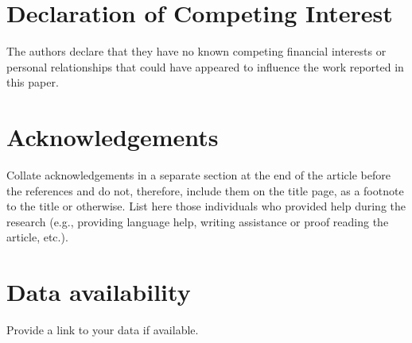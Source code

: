 \documentclass[review]{elsarticle}
\begin{document}
\section*{Declaration of Competing Interest}
The authors declare that they have no known competing financial interests or personal relationships that could have appeared to influence the work reported in this paper.

\section*{Acknowledgements}
Collate acknowledgements in a separate section at the end of the article before the references and do not, therefore, include them on the title page, as a footnote to the title or otherwise. List here those individuals who provided help during the research (e.g., providing language help, writing assistance or proof reading the article, etc.).

\section*{Data availability}
Provide a link to your data if available.


\end{document}
